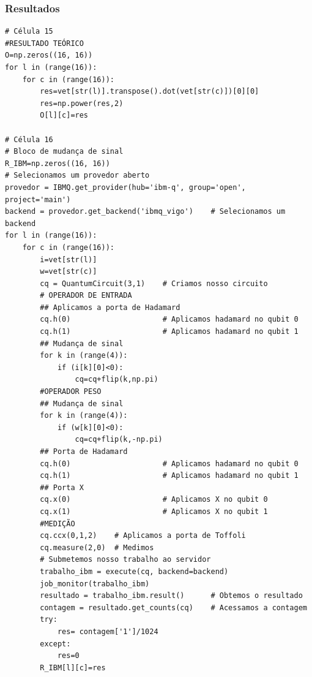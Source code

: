 \subsubsection{Resultados}
\begin{verbatim}
# Célula 15
#RESULTADO TEÓRICO
O=np.zeros((16, 16))
for l in (range(16)):
    for c in (range(16)):
        res=vet[str(l)].transpose().dot(vet[str(c)])[0][0]
        res=np.power(res,2)
        O[l][c]=res

# Célula 16
# Bloco de mudança de sinal
R_IBM=np.zeros((16, 16))
# Selecionamos um provedor aberto
provedor = IBMQ.get_provider(hub='ibm-q', group='open', project='main')
backend = provedor.get_backend('ibmq_vigo')    # Selecionamos um backend
for l in (range(16)):
    for c in (range(16)):
        i=vet[str(l)]
        w=vet[str(c)]
        cq = QuantumCircuit(3,1)    # Criamos nosso circuito        
        # OPERADOR DE ENTRADA
        ## Aplicamos a porta de Hadamard
        cq.h(0)                     # Aplicamos hadamard no qubit 0
        cq.h(1)                     # Aplicamos hadamard no qubit 1        
        ## Mudança de sinal
        for k in (range(4)):
            if (i[k][0]<0):
                cq=cq+flip(k,np.pi)
        #OPERADOR PESO
        ## Mudança de sinal
        for k in (range(4)):
            if (w[k][0]<0):
                cq=cq+flip(k,-np.pi)
        ## Porta de Hadamard
        cq.h(0)                     # Aplicamos hadamard no qubit 0
        cq.h(1)                     # Aplicamos hadamard no qubit 1
        ## Porta X
        cq.x(0)                     # Aplicamos X no qubit 0
        cq.x(1)                     # Aplicamos X no qubit 1
        #MEDIÇÃO
        cq.ccx(0,1,2)    # Aplicamos a porta de Toffoli
        cq.measure(2,0)  # Medimos
        # Submetemos nosso trabalho ao servidor
        trabalho_ibm = execute(cq, backend=backend)     
        job_monitor(trabalho_ibm)
        resultado = trabalho_ibm.result()      # Obtemos o resultado
        contagem = resultado.get_counts(cq)    # Acessamos a contagem
        try:
            res= contagem['1']/1024
        except:
            res=0
        R_IBM[l][c]=res


\end{verbatim}
